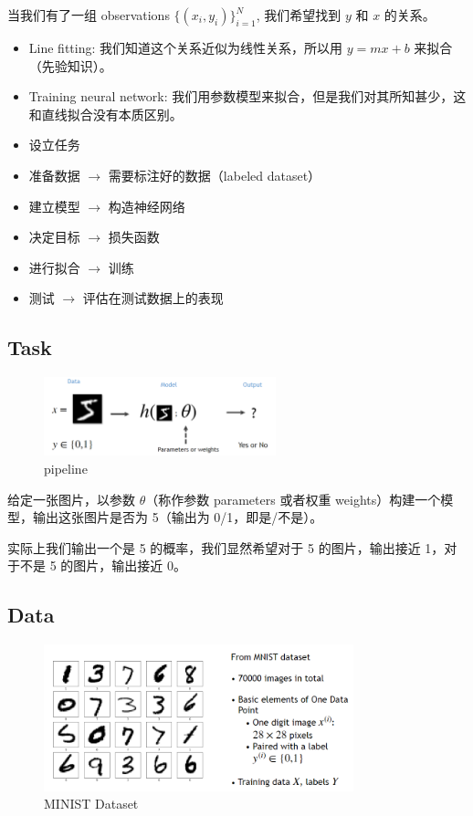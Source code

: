 当我们有了一组 observations $\{(x_i, y_i)\}_{i=1}^N$, 我们希望找到 $y$ 和 $x$ 的关系。
\begin{itemize}
    \item Line fitting: 我们知道这个关系近似为线性关系，所以用 $y = mx + b$ 来拟合（先验知识）。
    \item Training neural network: 我们用参数模型来拟合，但是我们对其所知甚少，这和直线拟合没有本质区别。
\end{itemize}
\begin{definition}[Outline]
    \begin{itemize}
        \item 设立任务
        \item 准备数据 $\to$ 需要标注好的数据（labeled dataset）
        \item 建立模型 $\to$ 构造神经网络
        \item 决定目标 $\to$ 损失函数
        \item 进行拟合 $\to$ 训练
        \item 测试 $\to$ 评估在测试数据上的表现
    \end{itemize}
\end{definition}

\subsection{Task}
\begin{figure}[htbp]
    \centering
    \includegraphics[width=0.6\textwidth]{figures/ministdataset.png}
    \caption{pipeline}
    \label{fig:ml-pipeline}
\end{figure}

给定一张图片，以参数 $\theta$（称作参数 parameters 或者权重 weights）构建一个模型，输出这张图片是否为 5（输出为 0/1，即是/不是）。

实际上我们输出一个是 5 的概率，我们显然希望对于 5 的图片，输出接近 1，对于不是 5 的图片，输出接近 0。

\subsection{Data}

\begin{figure}[H]
    \centering
    \includegraphics[width=0.8\textwidth]{figures/Mnistdataset.png}
    \caption{MINIST Dataset}
    \label{fig:ml-dataset}
\end{figure}

